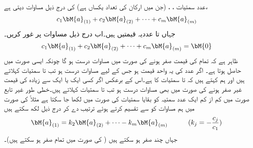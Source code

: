  عدد سمتیات ، ،  (جن میں ارکان کی تعداد یکساں ہے) کی  درج ذیل مساوات دیتی ہے،
\begin{align*}
c_1\bM{a}_{(1)}+c_2\bM{a}_{(2)}+\cdots+c_m\bM{a}_{(m)}
\end{align*}
جہاں  تا  عددیہ قیمتیں ہیں۔اب درج ذیل مساوات پر غور کریں۔
\begin{align}\label{مساوات_الجبرا_خطی_غیر_تابعیت_الف}
c_1\bM{a}_{(1)}+c_2\bM{a}_{(2)}+\cdots+c_m\bM{a}_{(m)}=\bM{0}
\end{align}
ظاہر ہے کہ تمام  کی قیمت صفر ہونے کی صورت میں مساوات  درست ہو گا چونکہ ایسی صورت میں  حاصل ہوتا ہے۔ اگر  عدد  کی یہ واحد قیمت ہو جس کے لیے مساوات  درست ہو تب  تا  سمتیات  کہلاتے ہیں اور ہم کہتے ہیں کہ   تا  سمتیات کا  ہے۔اس کے برعکس اگر کسی ایک یا ایک سے زیادہ  کی قیمت غیر صفر ہونے کی صورت میں بھی مساوات  درست ہو تب  تا  سمتیات  کہلاتے ہیں۔خطی طور غیر تابع صورت میں کم از کم ایک عدد سمتیہ کو بقایا سمتیات کی صورت میں لکھا جا سکتا ہے مثلاً  کی صورت میں ہم مساوات  کو  سے تقسیم کرتے ہوئے ترتیب دے کر درج ذیل لکھ سکتے ہیں
\begin{align*}
\bM{a}_{(1)}=k_2\bM{a}_{(2)}+\cdots-k_m\bM{a}_{(m)}   \quad \quad\quad (k_j=-\frac{c_j}{c_1})
\end{align*}
جہاں چند  صفر ہو سکتے ہیں ( کی صورت میں تمام  صفر ہو سکتے ہیں)۔

